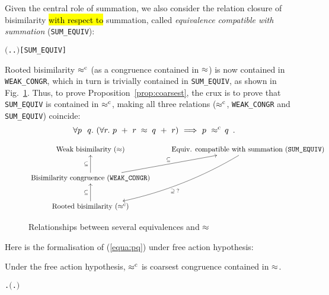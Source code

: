 Given the central role of
 summation, we also consider the relation closure of bisimilarity
 \hl{with respect to} summation, called \emph{equivalence compatible with summation}
(\texttt{SUM_EQUIV}): %
\begin{alltt}
    \HOLTokenDefEquality{} \ensuremath{(}\HOLTokenLambda{} . \HOLSymConst{\HOLTokenForall{}}.  \HOLSymConst{\ensuremath{+}}  \HOLSymConst{\HOLTokenWeakEQ}  \HOLSymConst{\ensuremath{+}} \ensuremath{)}\hfill{[SUM_EQUIV]}
\end{alltt}

Rooted bisimilarity $\mathrel{\approx^{\rm{c}}}$ (as a congruence contained in
$\approx$) is now contained in \texttt{WEAK_CONGR},
which in turn is trivially contained in \texttt{SUM_EQUIV}, as shown
in Fig.~\ref{fig:relationship}. Thus, to prove Proposition~\ref{prop:coarsest},
the crux is to prove that \texttt{SUM_EQUIV} is contained in
$\mathrel{\approx^{\rm{c}}}$,
making all three relations
($\mathrel{\approx^{\rm{c}}}$, \texttt{WEAK_CONGR} and \texttt{SUM_EQUIV}) coincide:
\begin{equation}
\label{equa:pq}
\forall p\ \ q.\ ( \forall r.\ p\ +\ r \;\approx\; q\ +\ r ) \
\Longrightarrow\ p\ \mathrel{\approx^{\rm{c}}}\ \! q\enspace.
\end{equation}

\begin{figure}[ht]
\begin{displaymath}
\xymatrix{
{\textrm{Weak bisimilarity } (\approx)} & {\textrm{Equiv.
    compatible with summation (\texttt{SUM\_EQUIV})}}
\ar@/^3ex/[ldd]^{\supseteq\; ?}\\
{\textrm{Bisimilarity congruence (\texttt{WEAK\_CONGR})}}
\ar[u]^{\subseteq} \ar[ru]^{\subseteq} \\
{\textrm{Rooted bisimilarity } (\rapprox)} \ar[u]^{\subseteq}
}
\end{displaymath}
\caption{Relationships between several equivalences and $\approx$}
\label{fig:relationship}
\end{figure}

Here is the formalisation of (\ref{equa:pq}) under free action hypothesis:
\begin{theorem}
  \label{thm:coarsestR}
  Under the free action hypothesis, $\mathrel{\approx^{\rm{c}}}$ is coarsest congruence contained in $\approx$.
\begin{alltt}
\HOLTokenTurnstile{} \HOLSymConst{\HOLTokenForall{}} .   \HOLSymConst{\HOLTokenConj{}}   \HOLSymConst{\HOLTokenImp{}} \ensuremath{(}\HOLSymConst{\HOLTokenForall{}}.  \HOLSymConst{\ensuremath{+}}  \HOLSymConst{\HOLTokenWeakEQ}  \HOLSymConst{\ensuremath{+}} \ensuremath{)} \HOLSymConst{\HOLTokenImp{}}  \HOLSymConst{\HOLTokenObsCongr} 
\end{alltt}
\end{theorem}

